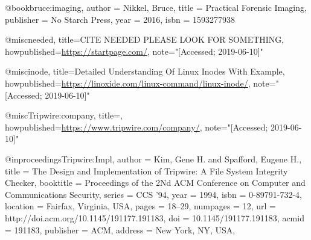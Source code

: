 @book{bruce:imaging,
  author    = {Nikkel, Bruce}, 
  title     = {Practical Forensic Imaging},
  publisher = {No Starch Press},
  year      = 2016,
  isbn      = {1593277938}
}

@misc{needed,
  title={{CITE NEEDED PLEASE LOOK FOR SOMETHING}},
  howpublished={\url{https://startpage.com/}},
  note="[Accessed; 2019-06-10]"
}

@misc{inode,
  title={{Detailed Understanding Of Linux Inodes With Example}},
  howpublished={\url{https://linoxide.com/linux-command/linux-inode/}},
  note="[Accessed; 2019-06-10]"
}

@misc{Tripwire:company,
  title={{}},
  howpublished={\url{https://www.tripwire.com/company/}},
  note="[Accessed; 2019-06-10]"
}

@inproceedings{Tripwire:Impl,
 author = {Kim, Gene H. and Spafford, Eugene H.},
 title = {The Design and Implementation of Tripwire: A File System Integrity Checker},
 booktitle = {Proceedings of the 2Nd ACM Conference on Computer and Communications Security},
 series = {CCS '94},
 year = {1994},
 isbn = {0-89791-732-4},
 location = {Fairfax, Virginia, USA},
 pages = {18--29},
 numpages = {12},
 url = {http://doi.acm.org/10.1145/191177.191183},
 doi = {10.1145/191177.191183},
 acmid = {191183},
 publisher = {ACM},
 address = {New York, NY, USA},
} 
